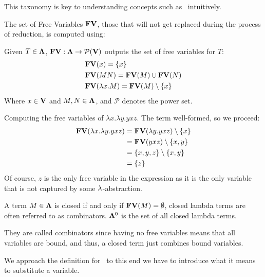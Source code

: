 \begin{remark}
  This taxonomy is key to understanding concepts such as \aequiv \ intuitively.
\end{remark}
The set of Free Variables $\mathbf{FV}$, those that will not get replaced during the process of reduction, is computed using:
\begin{definition} Given $T \in \mathbf{\Lambda} $, $\mathbf{FV} : \mathbf{\Lambda} \to \mathcal{P}(\mathbf{V}) $ outputs the set of free variables for $T$:
  \begin{align*}
    & \mathbf{FV}(x) = \{x\}\\
    & \mathbf{FV}(MN) = \mathbf{FV}(M) \cup \mathbf{FV}(N) \\
    & \mathbf{FV}(\lambda x . M) = \mathbf{FV}(M) \setminus \{x\}
  \end{align*}
  Where $ x \in \mathbf{V} $ and $ M, N \in \mathbf{\Lambda} $, and $\mathcal{P}$ denotes the power set.

\end{definition}
\begin{example} Computing the free variables of $\lambda x . \lambda y . y x z$. The term well-formed, so we proceed:
  \begin{align*}
    \mathbf{FV}(\lambda x . \lambda y . y x z) &= \mathbf{FV}(\lambda y . yxz) \setminus \{x\} \\
                                        &= \mathbf{FV}(yxz) \setminus \{x, y\} \\
                                        &= \{x, y, z\} \setminus \{x, y\} \\
                                        &= \{z\}
  \end{align*}
  Of course, $z$ is the only free variable in the expression as it is the only variable that is not captured by some $\lambda$-abstraction.
\end{example}
\begin{definition}
  A term $M \in \mathbf{\Lambda}$ is closed if and only if $\mathbf{FV}(M) = \emptyset$, closed lambda terms are often referred to as combinators. $\mathbf{\Lambda}^0$ is the set of all closed lambda terms.
\end{definition}
\begin{note} They are called combinators since having no free variables means that all variables are bound, and thus, a closed term just combines bound variables.
\end{note}

We approach the definition for \aequiv \, to this end we have to introduce what it means to substitute a variable.

